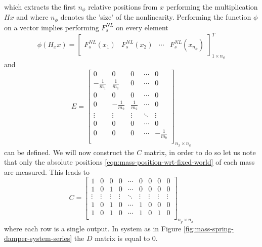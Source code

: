 which extracts the first $n_{\phi}$ relative positions from $x$ performing the multiplication $Hx$ and where $n_{\phi}$ denotes the 'size' of the nonlinearity. Performing the function $\phi$ on a vector implies performing $F^{NL}_s$ on every element
\begin{equation*}
    \phi(H_{x}x) =
    \begin{bmatrix}
        F_s^{NL}(x_1) & F_s^{NL}(x_2) & \cdots & F_s^{NL}(x_{n_{\phi}})
    \end{bmatrix}_{1 \times n_{\phi}}^T
\end{equation*}
and
\begin{equation}\label{eqn:msd-E}
    E =
    \begin{bmatrix}
        0 & 0 & 0 & \cdots & 0 \\
        -\frac{1}{m_1} & \frac{1}{m_1} & 0 & \cdots & 0 \\
        0 & 0 & 0 & \cdots & 0 \\
        0 & -\frac{1}{m_2} & \frac{1}{m_2} & \cdots & 0 \\
        \vdots & \vdots & \vdots & \ddots & \vdots \\
        0 & 0 & 0 & \cdots & 0 \\
        0 & 0 & 0 & \cdots & -\frac{1}{m_b} \\
    \end{bmatrix}_{n_x \times n_{\phi}}
\end{equation}
can be defined. We will now construct the $C$ matrix, in order to do so let us note that only the absolute positions \eqref{eqn:mass-position-wrt-fixed-world} of each mass are measured. This leads to
\begin{equation}\label{eqn:msd-C}
    C = 
    \begin{bmatrix}
        1 & 0 & 0 & 0 & \cdots & 0 & 0 & 0 & 0 \\
        1 & 0 & 1 & 0 & \cdots & 0 & 0 & 0 & 0 \\
        \vdots & \vdots & \vdots & \vdots & \ddots & \vdots & \vdots & \vdots & \vdots \\
        1 & 0 & 1 & 0 & \cdots & 1 & 0 & 0 & 0 \\
        1 & 0 & 1 & 0 & \cdots & 1 & 0 & 1 & 0 \\
    \end{bmatrix}_{n_y \times n_x}
\end{equation}
where each row is a single output. In system as in Figure \ref{fig:mass-spring-damper-system-series} the $D$ matrix is equal to $0$.
